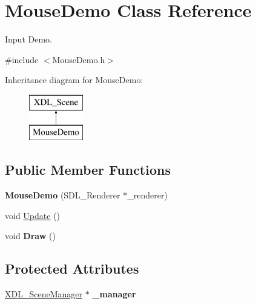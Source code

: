 \hypertarget{class_mouse_demo}{\section{Mouse\-Demo Class Reference}
\label{class_mouse_demo}
}


Input Demo.  




{\ttfamily \#include $<$Mouse\-Demo.\-h$>$}

Inheritance diagram for Mouse\-Demo\-:\begin{figure}[H]
\begin{center}
\leavevmode
\includegraphics[height=2.000000cm]{class_mouse_demo}
\end{center}
\end{figure}
\subsection*{Public Member Functions}
\begin{DoxyCompactItemize}
\item 
\hypertarget{class_mouse_demo_ab59667ab0fe639310bcd88341365e184}{{\bfseries Mouse\-Demo} (S\-D\-L\-\_\-\-Renderer $\ast$\-\_\-renderer)}\label{class_mouse_demo_ab59667ab0fe639310bcd88341365e184}

\item 
void \hyperlink{class_mouse_demo_a2c6ada1a783055794292daaf9863b7ec}{Update} ()
\item 
\hypertarget{class_mouse_demo_adeb61d66e5cc3eb19d27e0d03d234a3a}{void {\bfseries Draw} ()}\label{class_mouse_demo_adeb61d66e5cc3eb19d27e0d03d234a3a}

\end{DoxyCompactItemize}
\subsection*{Protected Attributes}
\begin{DoxyCompactItemize}
\item 
\hypertarget{class_mouse_demo_ac83fa2296abb35d2652ee25ddfc3b7dd}{\hyperlink{class_x_d_l___scene_manager}{X\-D\-L\-\_\-\-Scene\-Manager} $\ast$ {\bfseries \-\_\-manager}}\label{class_mouse_demo_ac83fa2296abb35d2652ee25ddfc3b7dd}

\end{DoxyCompactItemize}
